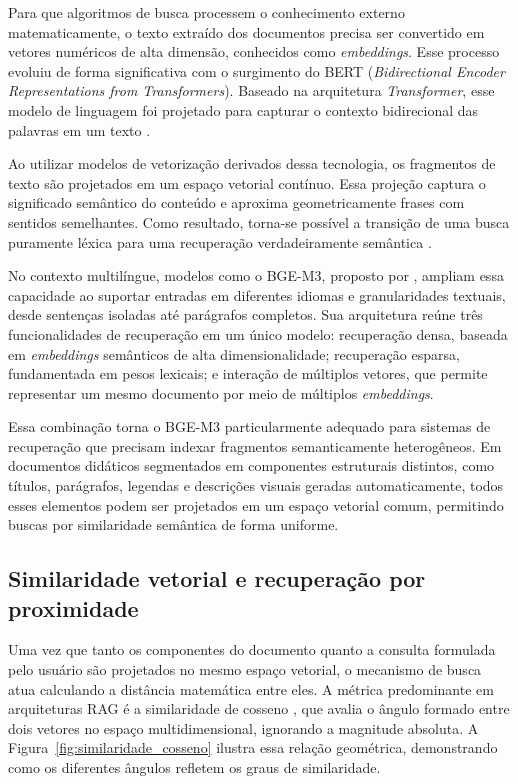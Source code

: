 Para que algoritmos de busca processem o conhecimento externo matematicamente, o texto extraído dos documentos precisa ser convertido em vetores numéricos de alta dimensão, conhecidos como \textit{embeddings}. Esse processo evoluiu de forma significativa com o surgimento do BERT (\textit{Bidirectional Encoder Representations from Transformers}). Baseado na arquitetura \textit{Transformer}, esse modelo de linguagem foi projetado para capturar o contexto bidirecional das palavras em um texto .

Ao utilizar modelos de vetorização derivados dessa tecnologia, os fragmentos de texto são projetados em um espaço vetorial contínuo. Essa projeção captura o significado semântico do conteúdo e aproxima geometricamente frases com sentidos semelhantes. Como resultado, torna-se possível a transição de uma busca puramente léxica para uma recuperação verdadeiramente semântica .

No contexto multilíngue, modelos como o BGE-M3, proposto por , ampliam essa capacidade ao suportar entradas em diferentes idiomas e granularidades textuais, desde sentenças isoladas até parágrafos completos. Sua arquitetura reúne três funcionalidades de recuperação em um único modelo: recuperação densa, baseada em \textit{embeddings} semânticos de alta dimensionalidade; recuperação esparsa, fundamentada em pesos lexicais; e interação de múltiplos vetores, que permite representar um mesmo documento por meio de múltiplos \textit{embeddings}.

Essa combinação torna o BGE-M3 particularmente adequado para sistemas de recuperação que precisam indexar fragmentos semanticamente heterogêneos. Em documentos didáticos segmentados em componentes estruturais distintos, como títulos, parágrafos, legendas e descrições visuais geradas automaticamente, todos esses elementos podem ser projetados em um espaço vetorial comum, permitindo buscas por similaridade semântica de forma uniforme.


\subsection{Similaridade vetorial e recuperação por proximidade}
\label{subsec:similaridade_vetorial}

Uma vez que tanto os componentes do documento quanto a consulta formulada pelo usuário são projetados no mesmo espaço vetorial, o mecanismo de busca atua calculando a distância matemática entre eles. A métrica predominante em arquiteturas RAG é a similaridade de cosseno , que avalia o ângulo formado entre dois vetores no espaço multidimensional, ignorando a magnitude absoluta. A Figura~\ref{fig:similaridade_cosseno} ilustra essa relação geométrica, demonstrando como os diferentes ângulos refletem os graus de similaridade.

